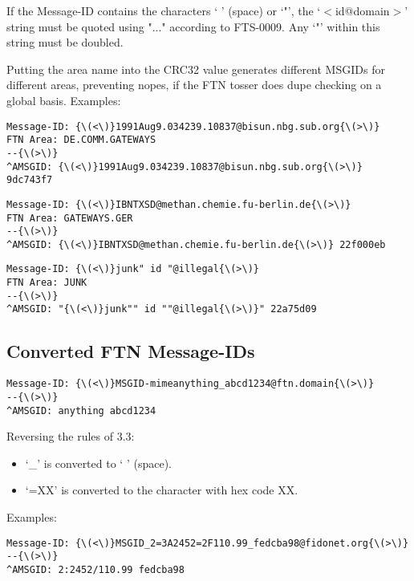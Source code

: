 \documentclass{article}
\begin{document}
If the Message-ID contains the characters ` ' (space) or `"', the `{\(<\)}id@domain{\(>\)}' string must be quoted using "..." according to FTS-0009. Any `"' within this string must be doubled.

Putting the area name into the CRC32 value generates different MSGIDs for different areas, preventing nopes, if the FTN tosser does dupe checking on a global basis.  Examples:  
\begin{verbatim}
Message-ID: {\(<\)}1991Aug9.034239.10837@bisun.nbg.sub.org{\(>\)} 
FTN Area: DE.COMM.GATEWAYS 
--{\(>\)} 
^AMSGID: {\(<\)}1991Aug9.034239.10837@bisun.nbg.sub.org{\(>\)} 9dc743f7
\end{verbatim}




\begin{verbatim}
Message-ID: {\(<\)}IBNTXSD@methan.chemie.fu-berlin.de{\(>\)} 
FTN Area: GATEWAYS.GER 
--{\(>\)} 
^AMSGID: {\(<\)}IBNTXSD@methan.chemie.fu-berlin.de{\(>\)} 22f000eb
\end{verbatim}




\begin{verbatim}
Message-ID: {\(<\)}junk" id "@illegal{\(>\)} 
FTN Area: JUNK 
--{\(>\)} 
^AMSGID: "{\(<\)}junk"" id ""@illegal{\(>\)}" 22a75d09 
\end{verbatim}



\subsection{Converted FTN Message-IDs }

\begin{verbatim}
Message-ID: {\(<\)}MSGID-mimeanything_abcd1234@ftn.domain{\(>\)} 
--{\(>\)} 
^AMSGID: anything abcd1234 
\end{verbatim}


Reversing the rules of 3.3: 
\begin{itemize}
\item `\_' is converted to ` ' (space).  
\item `=XX' is converted to the character with hex code XX.   
\end{itemize}


Examples:  
\begin{verbatim}
Message-ID: {\(<\)}MSGID_2=3A2452=2F110.99_fedcba98@fidonet.org{\(>\)} 
--{\(>\)} 
^AMSGID: 2:2452/110.99 fedcba98 
\end{verbatim}
\end{document}
